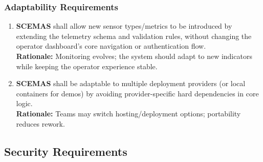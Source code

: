 \documentclass[]{article}
\begin{document}
\subsubsection{Adaptability Requirements}
\label{ssub:adaptability_requirements}
\begin{enumerate}[{MS-A}1. ]
	\item \textbf{SCEMAS} shall allow new sensor types/metrics to be introduced by extending the telemetry schema and validation rules, without changing the operator dashboard's core navigation or authentication flow.\\
    \textbf{Rationale:} Monitoring evolves; the system should adapt to new indicators while keeping the operator experience stable.
    
	\item \textbf{SCEMAS} shall be adaptable to multiple deployment providers (or local containers for demos) by avoiding provider-specific hard dependencies in core logic.\\
    \textbf{Rationale:} Teams may switch hosting/deployment options; portability reduces rework.
\end{enumerate}


\subsection{Security Requirements}
\label{sub:security_requirements}
\end{document}
